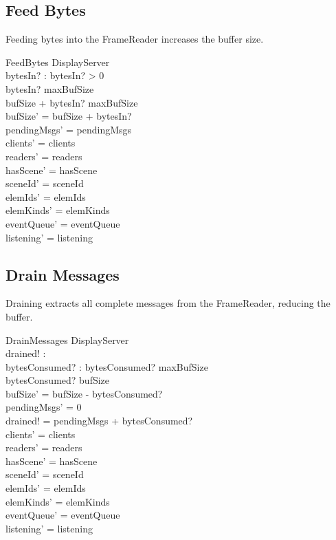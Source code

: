\documentclass[a4paper,10pt,fleqn]{article}
\begin{document}
\subsection{Feed Bytes}

Feeding bytes into the FrameReader increases the buffer size.

\begin{schema}{FeedBytes}
  \Delta DisplayServer \\
  bytesIn? : \nat
  \where
  bytesIn? > 0 \\
  bytesIn? \leq maxBufSize \\
  bufSize + bytesIn? \leq maxBufSize \\
  bufSize' = bufSize + bytesIn? \\
  pendingMsgs' = pendingMsgs \\
  clients' = clients \\
  readers' = readers \\
  hasScene' = hasScene \\
  sceneId' = sceneId \\
  elemIds' = elemIds \\
  elemKinds' = elemKinds \\
  eventQueue' = eventQueue \\
  listening' = listening
\end{schema}

\subsection{Drain Messages}

Draining extracts all complete messages from the FrameReader,
reducing the buffer.

\begin{schema}{DrainMessages}
  \Delta DisplayServer \\
  drained! : \nat \\
  bytesConsumed? : \nat
  \where
  bytesConsumed? \leq maxBufSize \\
  bytesConsumed? \leq bufSize \\
  bufSize' = bufSize - bytesConsumed? \\
  pendingMsgs' = 0 \\
  drained! = pendingMsgs + bytesConsumed? \\
  clients' = clients \\
  readers' = readers \\
  hasScene' = hasScene \\
  sceneId' = sceneId \\
  elemIds' = elemIds \\
  elemKinds' = elemKinds \\
  eventQueue' = eventQueue \\
  listening' = listening
\end{schema}
\end{document}
